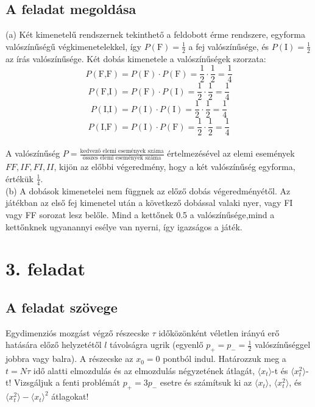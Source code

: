\documentclass[12pt]{article}
\begin{document}
\subsection*{A feladat megoldása}
(a) Két kimenetelű rendszernek tekinthető a feldobott érme rendszere, egyforma valószínűségű végkimenetelekkel, így $P(\text{F}) = \frac{1}{2} $ a fej valószínűsége, és  $P(\text{I}) = \frac{1}{2} $ az írás valószínűsége. Két dobás kimenetele a valószínűségek szorzata: $$P(\text{F,F}) = P(\text{F})\cdot P(\text{F}) = \frac{1}{2}\cdot \frac{1}{2} = \frac{1}{4} $$
$$P(\text{F,I}) = P(\text{F})\cdot P(\text{I}) = \frac{1}{2}\cdot \frac{1}{2} = \frac{1}{4} $$
$$P(\text{I,I}) = P(\text{I})\cdot P(\text{I}) = \frac{1}{2}\cdot \frac{1}{2} = \frac{1}{4} $$
$$P(\text{I,F}) = P(\text{I})\cdot P(\text{F}) = \frac{1}{2}\cdot \frac{1}{2} = \frac{1}{4} $$
\\
A valószínűség $P = \frac{\text{kedvező elemi események száma}}{\text{összes elemi események száma}}$ értelmezésével az elemi események ${FF, IF, FI, II}$, kijön az előbbi végeredmény, hogy a két valószínűség egyforma, értékük $\frac{1}{4}$.\\
(b) A dobások kimenetelei nem függnek az előző dobás végeredményétől. Az játékban az első fej kimenetel után a következő dobással valaki nyer, vagy FI vagy FF sorozat lesz belőle. Mind a kettőnek 0.5 a valószínűsége,mind a kettőnknek ugyanannyi esélye van nyerni, így igazságos a játék.
\newpage
\section*{3. feladat}
\subsection*{A feladat szövege}
Egydimenziós mozgást végző részecske $\tau$ időközönként véletlen irányú erő hatására előző helyzetétől $l$ távolságra ugrik (egyenlő $p_{+} = p_{-} =\frac{1}{2} $ valószínűséggel jobbra vagy balra). A részecske az $x_0 = 0$ pontból indul.
Határozzuk meg a $ t = N \tau$ idő alatti elmozdulás és az elmozdulás négyzetének átlagát, $\langle x_t\rangle$-t és $\langle x^2_t \rangle$-t!
Vizsgáljuk a fenti problémát $p_+ = 3p_-$ esetre és számítsuk ki az $\langle x_t \rangle $, $\langle x^2_t\rangle$, és $\langle x^2_t\rangle-\langle x_t \rangle ^2$ átlagokat!
\end{document}
